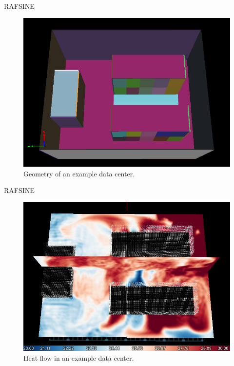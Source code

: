 \documentclass{beamer}
\begin{document}
\begin{frame}{RAFSINE}

\begin{figure}[ht]
\begin{center}
\includegraphics[width=0.9\linewidth]{voxels.png}
\end{center}
\caption{Geometry of an example data center.}
\label{fig:problem2}
\end{figure}

\end{frame}

\begin{frame}{RAFSINE}

\begin{figure}[ht]
\begin{center}
\includegraphics[width=0.9\linewidth]{temperature_halos.png}
\end{center}
\caption{Heat flow in an example data center.}
\label{fig:problem2}
\end{figure}

\end{frame}
\end{document}
